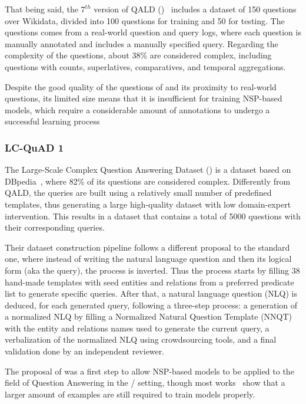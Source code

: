 That being said, the $7^{th}$ version of QALD (\QALDseven)~\cite{dataset:qald7-UsbeckNHKRN17} includes a 
dataset of 150 questions over Wikidata, divided into 100 questions for training and 50 for 
testing. The questions comes from a real-world question and query logs, where each question is 
manually annotated and includes a manually specified \SPARQL{} query. Regarding the complexity of 
the questions, about 38\% are considered complex, including questions with counts, superlatives, 
comparatives, and temporal aggregations.

Despite the good quality of the questions of \QALDseven{} and its proximity to real-world questions, 
its limited size means that it is insufficient for training NSP-based models, which require a 
considerable amount of annotations to undergo a successful learning process

\subsubsection{LC-QuAD 1}
\label{cap2:theoFrame/qakg/benchmarkDatasets/lcquad}
The Large-Scale Complex Question Answering Dataset (\LCQuADone{}) is a dataset based on 
DBpedia~\cite{dataset:lcquad-TrivediMDL17}, where 82\% of its questions are considered complex. 
Differently from QALD, the \SPARQL{} queries are built using a relatively small number of 
predefined templates, thus generating a large high-quality dataset with low domain-expert 
intervention. This results in a dataset that contains a total of 5000 questions with their 
corresponding queries.

Their dataset construction pipeline follows a different proposal to the standard one, where 
instead of writing the natural language question and then its logical form (aka the \SPARQL{} 
query), the process is inverted. Thus the process starts by filling 38 hand-made \SPARQL{} 
templates with seed entities and relations from a preferred predicate list to generate specific 
\SPARQL{} queries. After that, a natural language question (NLQ) is deduced, for each generated 
\SPARQL{} query, following a three-step process: a generation of a normalized NLQ by filling a 
Normalized Natural Question Template (NNQT) with the entity and relations names used to 
generate the current query, a verbalization of the normalized NLQ using crowdsourcing tools, 
and a final validation done by an independent reviewer.

The proposal of \LCQuADone{} was a first step to allow NSP-based models to be applied to the field 
of Question Answering in the \RDF{}/\SPARQL{} setting, though most works~\cite{qa:FuQTLYS20abs-2007-13069} 
show that a larger amount of examples are still required to train models properly.

